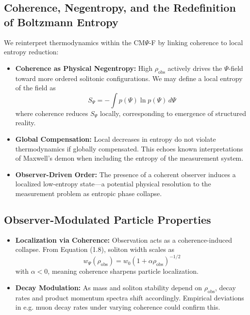 \subsection{Coherence, Negentropy, and the Redefinition of Boltzmann Entropy}
\label{subsec:entropy}

We reinterpret thermodynamics within the CM$\Psi$-F by linking coherence to local entropy reduction:

\begin{itemize}
    \item \textbf{Coherence as Physical Negentropy:} High $\rho_{\text{obs}}$ actively drives the $\Psi$-field toward more ordered solitonic configurations. We may define a local entropy of the field as
    \[
        S_{\Psi} = -\int p(\Psi) \ln p(\Psi)\,d\Psi
    \]
    where coherence reduces $S_{\Psi}$ locally, corresponding to emergence of structured reality.
    \item \textbf{Global Compensation:} Local decreases in entropy do not violate thermodynamics if globally compensated. This echoes known interpretations of Maxwell’s demon when including the entropy of the measurement system.
    \item \textbf{Observer-Driven Order:} The presence of a coherent observer induces a localized low-entropy state—a potential physical resolution to the measurement problem as entropic phase collapse.
\end{itemize}

\subsection{Observer-Modulated Particle Properties}
\label{subsec:particle-properties}

\begin{itemize}
    \item \textbf{Localization via Coherence:} Observation acts as a coherence-induced collapse. From Equation (1.8), soliton width scales as
    \[
        w_\Psi(\rho_{\text{obs}}) = w_0(1 + \alpha \rho_{\text{obs}})^{-1/2}
    \]
    with $\alpha < 0$, meaning coherence sharpens particle localization.
    \item \textbf{Decay Modulation:} As mass and soliton stability depend on $\rho_{\text{obs}}$, decay rates and product momentum spectra shift accordingly. Empirical deviations in e.g. muon decay rates under varying coherence could confirm this.
\end{itemize}


